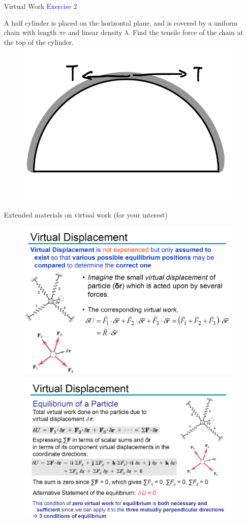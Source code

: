 \documentclass{beamer}
\begin{document}
\begin{frame}{Virtual Work}
\textcolor{blue}{Exercise 2}

A half cylinder is placed on the horizontal plane, and is covered by a uniform chain with length $\pi r$ and linear density $\lambda$. Find the tensile force of the chain at the top of the cylinder.
\begin{figure}[htbp]
\centering
\includegraphics[width=0.4 \linewidth, angle =0]{ex2.png}
\label{fig:2}
\end{figure}
\end{frame}

\begin{frame}{Extended materials on virtual work (for your interest)}
 \begin{figure}[htbp]
 \centering
 \includegraphics[width=0.8 \linewidth, angle =0]{virtual_work1.png}
 \label{fig:v1}
 \end{figure}
\end{frame}

\begin{frame}
  \begin{figure}[htbp]
  \centering
  \includegraphics[width=1 \linewidth, angle =0]{virtual_work2.png}
  \label{fig:v2}
  \end{figure}
\end{frame}
\end{document}
